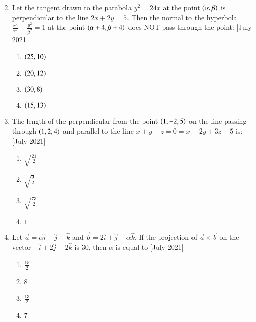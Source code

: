 \documentclass[journal]{IEEEtran}
\begin{document}
\begin{enumerate}
\begin{multicols}{2}
\begin{enumerate}
            \end{enumerate}
        \end{multicols}
        \item Let the tangent drawn to the parabola $y^2 = 24x$ at the point $\left(\alpha,\beta\right)$ is perpendicular to the line $2x+2y = 5$. Then the normal to the hyperbola $\frac{x^2}{\alpha^2} - \frac{y^2}{\beta^2} = 1$ at the point $\left(\alpha+4,\beta+4\right)$ does NOT pass through the point: \hfill{[July 2021]}
        \begin{multicols}{2}
            \begin{enumerate}
                \item $\left(25,10\right)$
                \item $\left(20,12\right)$
                \item $\left(30,8\right)$
                \item $\left(15,13\right)$
            \end{enumerate}
        \end{multicols}
        \item The length of the perpendicular from the point $\left(1,-2,5\right)$ on the line passing through $\left(1,2,4\right)$ and parallel to the line $x+y-z = 0 = x-2y+3z-5$ is: \hfill{[July 2021]}
        \begin{multicols}{2}
            \begin{enumerate}
                \item $\sqrt{\frac{21}{2}}$
                \item $\sqrt{\frac{9}{2}}$
                \item $\sqrt{\frac{73}{2}}$
                \item $1$
            \end{enumerate}
        \end{multicols}
       \item  Let $\vec{a}=\alpha \hat{i} + \hat{j} - \hat{k}$ and $\vec{b} = 2\hat{i}+\hat{j}-\alpha\hat{k}$. If the projection of $\vec{a} \times \vec{b}$ on the vector $-\hat{i}+2\hat{j}-2\hat{k}$ is 30, then $\alpha$ is equal to \hfill{[July 2021]}
       \begin{multicols}{2}
           \begin{enumerate}
               \item $\frac{15}{2}$
               \item 8
               \item $\frac{13}{2}$
               \item $7$
           \end{enumerate}
       \end{multicols}
    
\end{enumerate}
\end{document}
